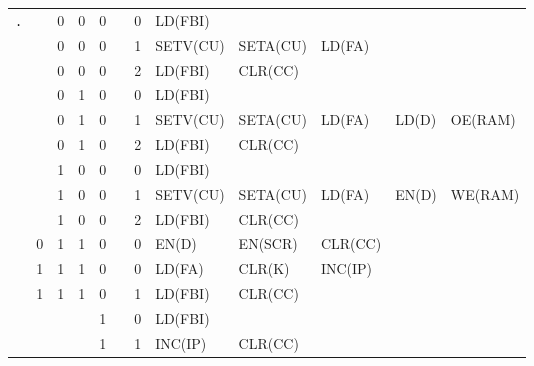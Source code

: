 \begin{footnotesize}
\begin{longtable}[c] {c|ccccc|c|lllll}
    \rowcolor{Gray}\texttt{.}       &   & 0 & 0 & 0 &   & 0  & LD(FBI)     &           &           &         &                \\
    \rowcolor{Gray}                 &   & 0 & 0 & 0 &   & 1  & SETV(CU)    & SETA(CU)  & LD(FA)    &        &                \\ 
    \rowcolor{Gray}                 &   & 0 & 0 & 0 &   & 2  & LD(FBI)     & CLR(CC)   &           &        &                \\
    \rowcolor{White}                &   & 0 & 1 & 0 &   & 0  & LD(FBI)     &           &           &         &                \\
    \rowcolor{White}                &   & 0 & 1 & 0 &   & 1  & SETV(CU)    & SETA(CU)  & LD(FA)    & LD(D)  & OE(RAM)        \\ 
    \rowcolor{White}                &   & 0 & 1 & 0 &   & 2  & LD(FBI)     & CLR(CC)   &           &        &                \\
    \rowcolor{Gray}                 &   & 1 & 0 & 0 &   & 0  & LD(FBI)     &           &           &         &                \\
    \rowcolor{Gray}                 &   & 1 & 0 & 0 &   & 1  & SETV(CU)    & SETA(CU)  & LD(FA)    & EN(D)  & WE(RAM)        \\ 
    \rowcolor{Gray}                 &   & 1 & 0 & 0 &   & 2  & LD(FBI)     & CLR(CC)          &    &        &                \\
    \rowcolor{White}                & 0 & 1 & 1 & 0 &   & 0  & EN(D)       & EN(SCR)   & CLR(CC)   &         &               \\ 
    \rowcolor{Gray}                 & 1 & 1 & 1 & 0 &   & 0  & LD(FA)      & CLR(K)    & INC(IP)   &        &                \\ 
    \rowcolor{Gray}                 & 1 & 1 & 1 & 0 &   & 1  & LD(FBI)     & CLR(CC)   &           &        &                \\
    \rowcolor{White}                &   &   &   & 1 &   & 0  & LD(FBI)     &           &           &        &                \\
    \rowcolor{White}                &   &   &   & 1 &   & 1  & INC(IP)     & CLR(CC)   &           &        &                \\ \hline
   

\end{longtable}
\end{footnotesize}
